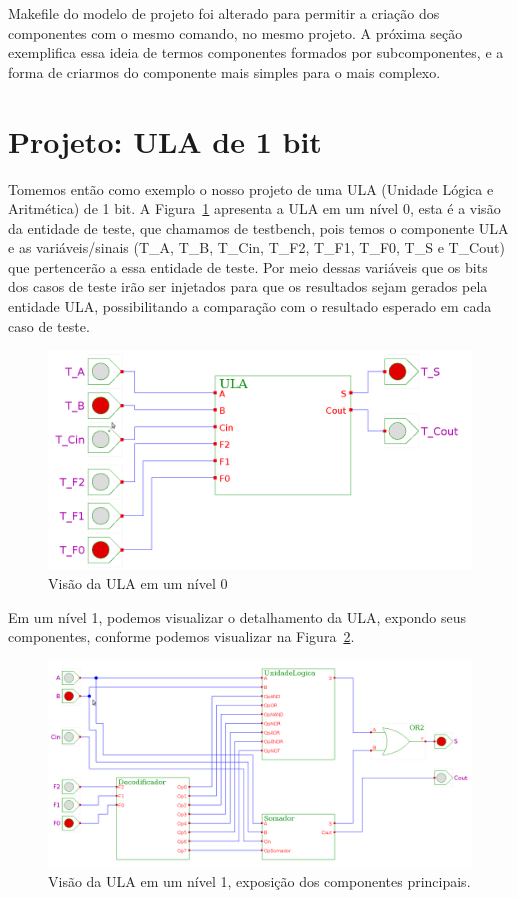 \documentclass[a4paper,10pt]{report}
\begin{document}
Makefile do modelo de projeto foi alterado para permitir a criação dos componentes com o mesmo comando, no mesmo projeto. A próxima seção exemplifica essa ideia de termos componentes formados por subcomponentes, e a forma de criarmos do componente mais simples para o mais complexo.

\section{Projeto: ULA de 1 bit}

Tomemos então como exemplo o nosso projeto de uma ULA (Unidade Lógica e Aritmética) de 1 bit. A Figura~\ref{fig:ULA_000} apresenta a ULA em um nível 0, esta é a visão da entidade de teste, que chamamos de testbench, pois temos o componente ULA e as variáveis/sinais (T\_A, T\_B, T\_Cin, T\_F2, T\_F1, T\_F0, T\_S e T\_Cout) que pertencerão a essa entidade de teste.
Por meio dessas variáveis que os bits dos casos de teste irão ser injetados para que os resultados sejam gerados pela entidade ULA, possibilitando a comparação com o resultado esperado em cada caso de teste.

\begin{figure}[H]
\centering
\includegraphics[width=1\textwidth]{figuras/ULA_000.png}
\caption{Visão da ULA em um nível 0}
\label{fig:ULA_000}
\end{figure}

Em um nível 1, podemos visualizar o detalhamento da ULA, expondo seus componentes, conforme podemos visualizar na Figura~\ref{fig:ULA_001}.

\begin{figure}[H]
\centering
\includegraphics[width=1\textwidth]{figuras/ULA_001.png}
\caption{Visão da ULA em um nível 1, exposição dos componentes principais.}
\label{fig:ULA_001}
\end{figure}
\end{document}
